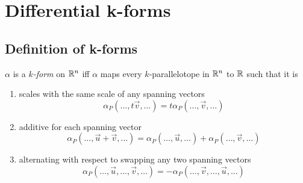 \documentclass[notes]{subfiles}
\begin{document}
\setcounter{section}{6}
\section{Differential k-forms}
\subsection{Definition of k-forms}

\begin{definition}
    $\alpha$ is a \textit{$k$-form} on $\mathbb{R}^n$ iff $\alpha$ maps every $k$-parallelotope in $\mathbb{R}^n$ to $\mathbb{R}$ such that it is
    \begin{enumerate}[label = (\arabic*)]
        \item scales with the same scale of any spanning vectors
        \[
            \alpha_P(\ldots, t\vec{v}, \ldots) = t\alpha_P(\ldots, \vec{v}, \ldots)
        \]
        \item additive for each spanning vector
        \[
            \alpha_P(\ldots, \vec{u} + \vec{v}, \ldots) = \alpha_P(\ldots, \vec{u}, \ldots) + \alpha_P(\ldots, \vec{v}, \ldots)
        \]
        \item alternating with respect to swapping any two spanning vectors
        \[
            \alpha_P(\ldots, \vec{u}, \ldots, \vec{v}, \ldots) = -\alpha_P(\ldots, \vec{v}, \ldots, \vec{u}, \ldots)
        \]
    \end{enumerate}
\end{definition}
\end{document}

